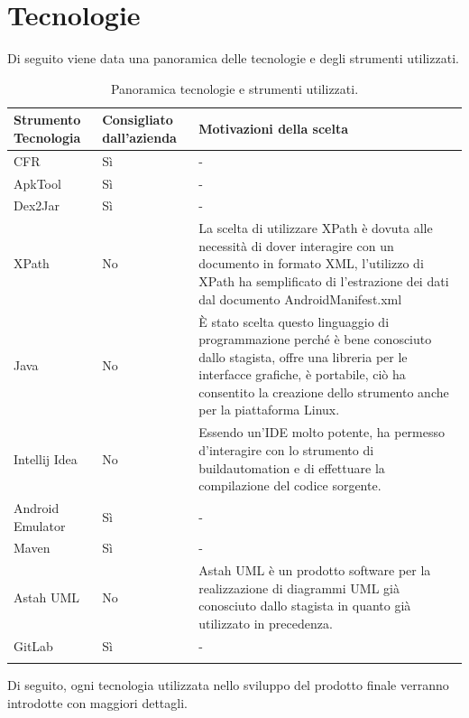 

\section{Tecnologie}\label{sec:tecnologie}
Di seguito viene data una panoramica delle tecnologie e degli strumenti utilizzati.
\begin{center}
    \begin{longtable}{ | C{3cm}| C{3cm} |C{7cm} |}
        \hline
        \textbf{Strumento Tecnologia} &
        \textbf{Consigliato dall'azienda}&
        \textbf{Motivazioni della scelta} \\\hline
        CFR & Sì & - \\\hline
        ApkTool                  & Sì & - \\\hline
        Dex2Jar                  & Sì & - \\\hline
        XPath                    & No & La scelta di utilizzare XPath è dovuta alle necessità di dover interagire con un documento in formato XML, l'utilizzo di XPath ha semplificato di l'estrazione dei dati dal documento AndroidManifest.xml\\\hline
        Java                     & No & \`{E} stato scelta questo linguaggio di programmazione perché è bene conosciuto dallo stagista, offre una libreria per le interfacce grafiche, è portabile, ciò ha consentito la creazione dello strumento anche per la piattaforma Linux. \\\hline
        Intellij Idea            & No & Essendo un'IDE molto potente, ha permesso d'interagire con lo strumento di \gls{buildautomation} e di effettuare la compilazione del codice sorgente. \\\hline
        Android Emulator         & Sì & - \\\hline
        Maven                    & Sì & - \\\hline
        Astah UML                & No & Astah UML è un prodotto software per la realizzazione di diagrammi UML già conosciuto dallo stagista in quanto già utilizzato in precedenza. \\\hline
        GitLab                   & Sì & -\\\hline
        \caption{Panoramica tecnologie e strumenti utilizzati.}
    \end{longtable}
\end{center}


Di seguito, ogni tecnologia utilizzata nello sviluppo del prodotto finale verranno introdotte con maggiori dettagli.
